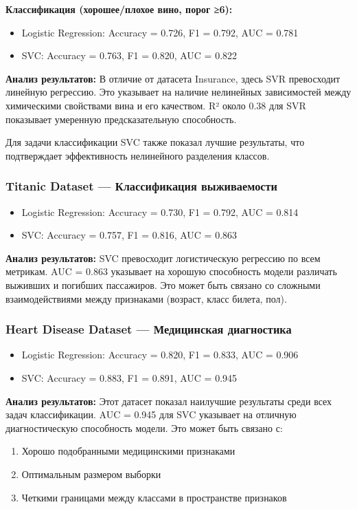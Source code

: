 \documentclass[a4paper]{article}
\begin{document}
\textbf{Классификация (хорошее/плохое вино, порог ≥6):}
\begin{itemize}
    \item Logistic Regression: Accuracy = 0.726, F1 = 0.792, AUC = 0.781
    \item SVC: Accuracy = 0.763, F1 = 0.820, AUC = 0.822
\end{itemize}

\textbf{Анализ результатов:}
В отличие от датасета Insurance, здесь SVR превосходит линейную регрессию. Это указывает на наличие нелинейных зависимостей между химическими свойствами вина и его качеством. R² около 0.38 для SVR показывает умеренную предсказательную способность.

Для задачи классификации SVC также показал лучшие результаты, что подтверждает эффективность нелинейного разделения классов.

\subsubsection{Titanic Dataset — Классификация выживаемости}

\begin{itemize}
    \item Logistic Regression: Accuracy = 0.730, F1 = 0.792, AUC = 0.814
    \item SVC: Accuracy = 0.757, F1 = 0.816, AUC = 0.863
\end{itemize}

\textbf{Анализ результатов:}
SVC превосходит логистическую регрессию по всем метрикам. AUC = 0.863 указывает на хорошую способность модели различать выживших и погибших пассажиров. Это может быть связано со сложными взаимодействиями между признаками (возраст, класс билета, пол).

\subsubsection{Heart Disease Dataset — Медицинская диагностика}

\begin{itemize}
    \item Logistic Regression: Accuracy = 0.820, F1 = 0.833, AUC = 0.906
    \item SVC: Accuracy = 0.883, F1 = 0.891, AUC = 0.945
\end{itemize}

\textbf{Анализ результатов:}
Этот датасет показал наилучшие результаты среди всех задач классификации. AUC = 0.945 для SVC указывает на отличную диагностическую способность модели. Это может быть связано с:
\begin{enumerate}
    \item Хорошо подобранными медицинскими признаками
    \item Оптимальным размером выборки
    \item Четкими границами между классами в пространстве признаков
\end{enumerate}
\end{document}

